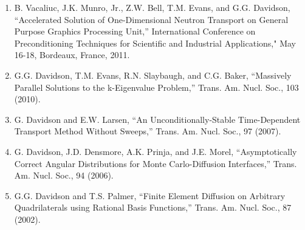 \documentclass[letterpaper,11pt]{article}
\begin{document}
\begin{enumerate}
  \item B. Vacaliuc, J.K. Munro, Jr., Z.W. Bell, T.M. Evans, and
    G.G. Davidson, ``Accelerated Solution of One-Dimensional Neutron
    Transport on General Purpose Graphics Processing Unit,''
    International Conference on Preconditioning Techniques for
    Scientific and Industrial Applications," May 16-18, Bordeaux,
    France, 2011.
  \item G.G. Davidson, T.M. Evans, R.N. Slaybaugh, and C.G. Baker,
    ``Massively Parallel Solutions to the k-Eigenvalue Problem,''
    Trans. Am. Nucl. Soc., 103 (2010).
  \item G. Davidson and E.W. Larsen, ``An Unconditionally-Stable
    Time-Dependent Transport Method Without Sweeps,''
    Trans. Am. Nucl. Soc., 97 (2007).
  \item G. Davidson, J.D. Densmore, A.K. Prinja, and J.E. Morel,
    ``Asymptotically Correct Angular Distributions for Monte
    Carlo-Diffusion Interfaces,'' Trans. Am. Nucl. Soc., 94 (2006).
  \item G.G. Davidson and T.S. Palmer, ``Finite Element Diffusion on
    Arbitrary Quadrilaterals using Rational Basis Functions,''
    Trans. Am. Nucl. Soc., 87 (2002).
\end{enumerate}

\end{document}
